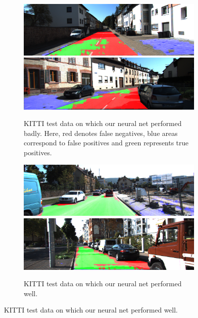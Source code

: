 \begin{figure}[]
    \begin{subfigure}[t]{\columnwidth}
        \includegraphics[width=\columnwidth]{figures/kitti_eval/Persp_um_road_000077.png}
        \includegraphics[width=\columnwidth]{figures/kitti_eval/Persp_um_road_000095.png}
        \caption{KITTI test data on which our neural net performed badly. Here, red denotes false negatives, blue areas correspond to false positives and green represents true positives.}
        \label{fig:sfig1}
    \end{subfigure}
    \begin{subfigure}[t]{\columnwidth}
        \includegraphics[width=\columnwidth]{figures/kitti_eval/Persp_uu_road_000027.png}
        \includegraphics[width=\columnwidth]{figures/kitti_eval/Persp_uu_road_000082.png}
        \caption{KITTI test data on which our neural net performed well.}
        \label{fig:sfig2}
    \end{subfigure}
\end{figure}

